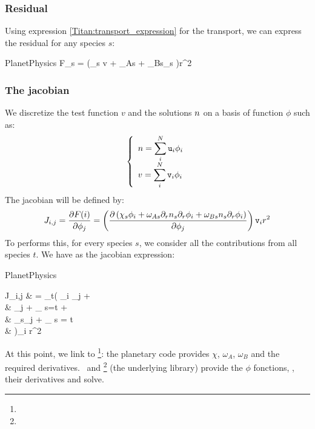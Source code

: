 \subsubsection{Residual}

Using expression \ref{Titan:transport_expression} for the transport, we can
express the residual for any species $s$:
\begin{equationCode}{PlanetPhysics}
F_s = \left(\chi_s v + \omega_{As} + \omega_{Bs}\conc_s \right)r^2
\end{equationCode}

\subsubsection{The jacobian}

We discretize the test function $v$ and the solutions $n$ on
a basis of function $\phi$ such as:
\[
  \left\{\begin{array}{l}
         n = \displaystyle\sum_i^N \mathtt{u}_i\phi_i \\[5pt]
         v     = \displaystyle\sum_i^N \mathtt{v}_i\phi_i \\
         \end{array}\right.
\]
%
The jacobian will be defined by:
\[
J_{i,j} = \frac{\partial F(i)}{\partial\phi_j} = 
        \left(\frac{\partial\left(\chi_s \phi_i + \omega_{As}\partial_{r}{n_s}\partial_{r}{\phi_i} + \omega_{Bs}n_s\partial_{r}{\phi_i}\right)}{\partial\phi_j} \right) \mathtt{v}_i r^2 
\]
%
To performs this, for every species $s$, we consider all the contributions
from all species $t$. We have as the jacobian expression:
\begin{equationCode}{PlanetPhysics}
\begin{split}
J_{i,j} & = \sum_t\Bigg( \phi_i \phi_j +  \\  
        & \hphantom{= \sum_t\Bigg(}
            \phi_j + 
            _{ s=t}  + \\ 
        & \hphantom{= \sum_t\Bigg(}
             \conc_s\phi_j +
            _{ s = t}  \\
        & \hphantom{= \sum_t\Bigg(} \Bigg)\vi_i r^2 
\end{split}
\end{equationCode}

At this point, we link to \GRINS\footnote{\GitGrins}: the planetary code provides $\chi$,
$\omega_A$, $\omega_B$ and the required derivatives. \GRINS\ and \LibMesh\footnote{\GitLibmesh} (the underlying library)
provide the $\phi$ fonctions, \conc, their derivatives and solve.
